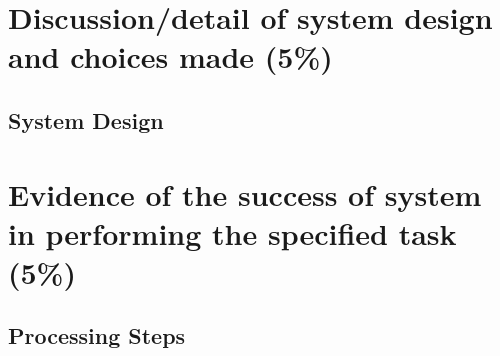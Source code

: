 \documentclass[a4paper,12pt]{article}
\begin{document}
\section*{Discussion/detail of system design and choices made (5\%)}
\subsection*{System Design}

\section*{Evidence of the success of system in performing the specified task (5\%)}
\subsection*{Processing Steps}

\end{document}
